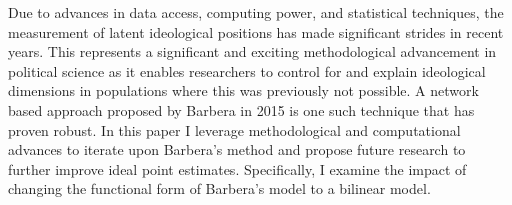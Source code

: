 \documentclass[../template.tex]{subfiles}
\begin{document}
Due to advances in data access, computing power, and statistical techniques, the measurement of latent ideological positions has made significant strides in recent years. This represents a significant and exciting methodological advancement in political science as it enables researchers to control for and explain ideological dimensions in populations where this was previously not possible. A network based approach proposed by Barbera in 2015 is one such technique that has proven robust. In this paper I leverage methodological and computational advances to iterate upon Barbera’s method and propose future research to further improve ideal point estimates. Specifically, I examine the impact of changing the functional form of Barbera’s model to a bilinear model. 
\end{document}
